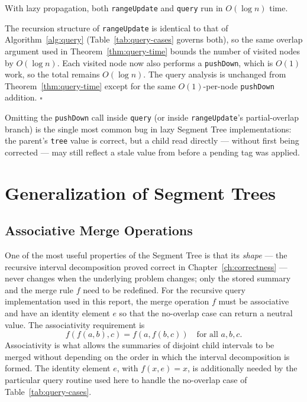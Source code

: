 \documentclass[
  11pt,
  a4paper,
  twoside=false,
  numbers=noenddot,
  headings=big,
  parskip=half,
  toc=bibliography,
  toc=listof,
  bibliography=totoc
]{scrreprt}
\newenvironment{proof}[1][Proof]{\par\noindent{\bfseries\sffamily\color{navy}#1.}\enspace}{\hfill$\square$\par\medskip}
\newcommand{\Oh}[1]{O\!\left(#1\right)}
\begin{document}
\begin{lem}\label{lem:lazy-time}
With lazy propagation, both \texttt{rangeUpdate} and \texttt{query} run in $\Oh{\log n}$ time.
\end{lem}
\begin{proof}
The recursion structure of \texttt{rangeUpdate} is identical to that of Algorithm~\ref{alg:query} (Table~\ref{tab:query-cases} governs both), so the same overlap argument used in Theorem~\ref{thm:query-time} bounds the number of visited nodes by $\Oh{\log n}$. Each visited node now also performs a \texttt{pushDown}, which is $\Oh{1}$ work, so the total remains $\Oh{\log n}$. The query analysis is unchanged from Theorem~\ref{thm:query-time} except for the same $\Oh{1}$-per-node \texttt{pushDown} addition.
\end{proof}

\begin{pitfall}
Omitting the \texttt{pushDown} call inside \texttt{query} (or inside \texttt{rangeUpdate}'s partial-overlap branch) is the single most common bug in lazy Segment Tree implementations: the parent's \texttt{tree} value is correct, but a child read directly --- without first being corrected --- may still reflect a stale value from before a pending tag was applied.
\end{pitfall}

\chapter{Generalization of Segment Trees}
\label{ch:general}

\section{Associative Merge Operations}
One of the most useful properties of the Segment Tree is that its \emph{shape} --- the recursive interval decomposition proved correct in Chapter~\ref{ch:correctness} --- never changes when the underlying problem changes; only the stored summary and the merge rule $f$ need to be redefined. For the recursive query implementation used in this report, the merge operation $f$ must be associative and have an identity element $e$ so that the no-overlap case can return a neutral value. The associativity requirement is
\begin{equation}
f(f(a,b),c) = f(a,f(b,c)) \quad \text{for all } a,b,c.
\label{eq:assoc}
\end{equation}
Associativity is what allows the summaries of disjoint child intervals to be merged without depending on the order in which the interval decomposition is formed. The identity element $e$, with $f(x,e)=x$, is additionally needed by the particular query routine used here to handle the no-overlap case of Table~\ref{tab:query-cases}.
\end{document}
